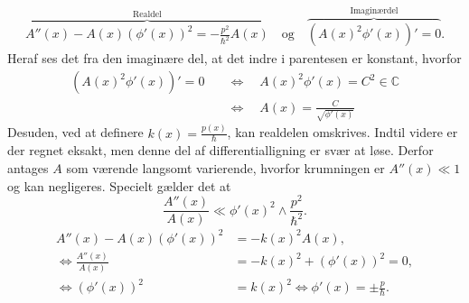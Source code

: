 \begin{align}
    \overbrace{A''(x) - A(x)\left( \phi'(x) \right)^{2} = - \frac{p^{2}}{\hbar^{2}}A(x)}^{\text{Realdel}} \quad \text{og} \quad%
    \overbrace{\left( A(x)^{2}\phi'(x) \right)' = 0}^{\text{Imaginærdel}}.
    \label{eq:realogimag}
\end{align}
Heraf ses det fra den imaginære del, at det indre i parentesen er konstant, hvorfor
\begin{align}
    \left( A(x)^{2}\phi'(x) \right)' = 0  \quad & \Leftrightarrow  \quad A(x)^{2}\phi'(x) = C^{2} \in \mathbb{C} \\
    & \Leftrightarrow  \quad A(x) = \frac{C}{\sqrt{\phi'(x)}}
    \label{eq:konst}
\end{align}
Desuden, ved at definere $k(x) = \frac{p(x)}{\hbar}$, kan realdelen omskrives. Indtil videre er der regnet eksakt, men denne del af differentialligning er svær at løse. Derfor antages $A$ som værende langsomt varierende, hvorfor krumningen er $A''(x)\ll 1$ og kan  negligeres.
Specielt gælder det at
\begin{equation}
  \frac{A''(x)}{A(x)} \ll \phi'(x)^{2}\wedge \frac{p^{2}}{\hbar^{2}}.
  \label{eq:TheApprox}
\end{equation}
\begin{align}
    A''(x) - A(x)(\phi'(x))^{2} & =  -k(x)^{2}A(x),\\
    \Leftrightarrow \frac{A''(x)}{A(x)} & = -k(x)^{2} + (\phi'(x))^{2} = 0, \\
    \Leftrightarrow \left(\phi'(x)\right)^{2} & = k(x)^{2} \Leftrightarrow  \phi'(x) = \pm \frac{p}{\hbar}.
    \label{eq:ho}
\end{align}

